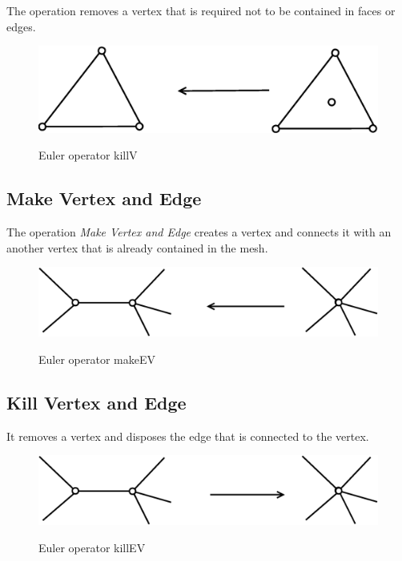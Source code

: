 The operation removes a vertex that is required not to be contained in faces or
edges.

\begin{figure}[h]
\centering
\includegraphics[scale=0.25]{../img/killV.eps}
\label{fig:killv}
\caption{Euler operator killV}
\end{figure}


\subsection{Make Vertex and Edge}

The operation \emph{Make Vertex and Edge} creates a vertex and connects
it with an another vertex that is already contained in the mesh.

\begin{figure}[h]
\centering
\includegraphics[scale=0.25]{../img/makeEV.eps}
\label{fig:makeev}
\caption{Euler operator makeEV}
\end{figure}

\subsection{Kill Vertex and Edge}

It removes a vertex and disposes the edge that is connected to the vertex.

\begin{figure}[H]
\centering
\includegraphics[scale=0.25]{../img/killEV.eps}
\label{fig:killev}
\caption{Euler operator killEV}
\end{figure}

